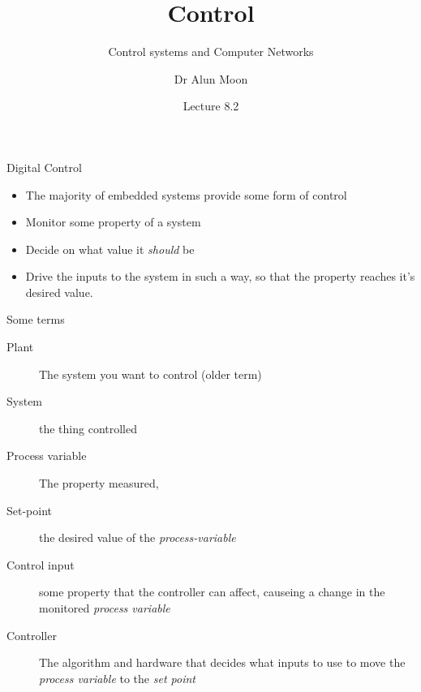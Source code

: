 \documentclass[xcolor=svgnames]{beamer}
\title{Control}
\subtitle{Control systems and Computer Networks}
\author{Dr Alun Moon}
\date{Lecture 8.2}
\begin{document}
\frame{\maketitle}

\begin{frame}{Digital Control}
    \begin{itemize}
        \item The majority of embedded systems provide some form of control
        \item Monitor some property of a system
        \item Decide on what value it \emph{should} be
        \item Drive the inputs to the system in such a way, so that the property reaches it's desired value.
    \end{itemize}
\end{frame}

\begin{frame}{Some terms}
\begin{description}
    \item[Plant] The system you want to control (older term)
    \item[System] the thing controlled
    \item[Process variable] The property measured,
    \item[Set-point] the desired value of the \emph{process-variable}
    \item[Control input] some property that the controller can affect, causeing a change in the monitored \emph{process variable}
    \item[Controller] The algorithm and hardware that decides what inputs to use to move the \emph{process variable} to the \emph{set point}
\end{description}
\end{frame}
\end{document}
